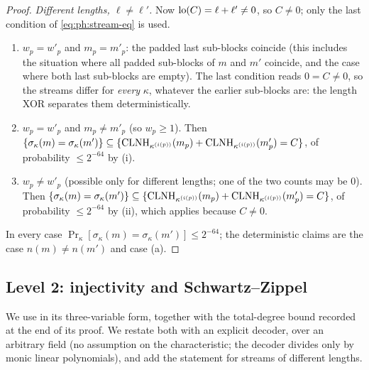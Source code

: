 \begin{proof}
\emph{Different lengths, $\ell\ne\ell'$.}  Now $\mathrm{lo}(C)=\ell+\ell'\ne0$, so
$C\ne0$; only the last condition of \eqref{eq:ph:stream-eq} is used.
\begin{enumerate}[label=(\alph*)]
\item $w_p=w'_p$ and $m_p=m'_p$: the padded last sub-blocks coincide (this
      includes the situation where all padded sub-blocks of $m$ and $m'$
      coincide, and the case where both last sub-blocks are empty).  The
      last condition reads $0=C\ne0$, so the streams differ for \emph{every}
      $\kappa$, whatever the earlier sub-blocks are: the length XOR separates
      them deterministically.
\item $w_p=w'_p$ and $m_p\ne m'_p$ (so $w_p\ge1$).  Then
      $\{\sigma_\kappa(m)=\sigma_\kappa(m')\}\subseteq\{\mathrm{CLNH}_{\kappa^{(i(p))}}(m_p)+\mathrm{CLNH}_{\kappa^{(i(p))}}(m'_p)=C\}$,
      of probability $\le2^{-64}$ by (i).
\item $w_p\ne w'_p$ (possible only for different lengths; one of the two
      counts may be $0$).  Then
      $\{\sigma_\kappa(m)=\sigma_\kappa(m')\}\subseteq\{\mathrm{CLNH}_{\kappa^{(i(p))}}(m_p)+\mathrm{CLNH}_{\kappa^{(i(p))}}(m'_p)=C\}$,
      of probability $\le2^{-64}$ by (ii), which applies
      because $C\ne0$.
\end{enumerate}
In every case $\Pr_\kappa[\sigma_\kappa(m)=\sigma_\kappa(m')]\le2^{-64}$; the
deterministic claims are the case $n(m)\ne n(m')$ and case (a).
\end{proof}

\subsection{Level 2: injectivity and Schwartz--Zippel}

We use  in its three-variable form, together with
the total-degree bound recorded at the end of its proof.  We restate both
with an explicit decoder, over an arbitrary field (no assumption on the
characteristic; the decoder divides only by monic linear polynomials), and
add the statement for streams of different lengths.

